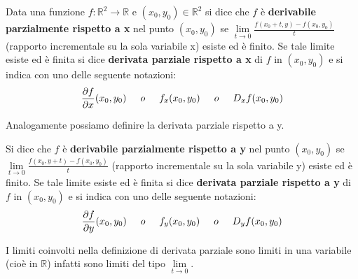 \begin{definition}
Data una funzione $f: \mathbb{R}^2 \to \mathbb{R}$ e $(x_0,y_0)\in \mathbb{R}^2$ si dice che $f$ è \textbf{derivabile parzialmente rispetto a x}  nel punto $(x_0,y_0)$ se $\lim\limits_{t\to 0}\frac{f(x_0 + t, y) - f(x_0,y_0)}{t}$ (rapporto incrementale su la sola variabile x) esiste ed è finito. Se tale limite esiste ed è finita si dice \textbf{derivata parziale rispetto a x} di $f$ in $(x_0,y_0)$ e si indica con uno delle seguente notazioni:
\vspace{-5pt}
\[\frac{\partial f}{\partial x}(x_0,y_0) \hspace{.5cm}o\hspace{.5cm} f_x(x_0,y_0) \hspace{.5cm}o\hspace{.5cm} D_x f(x_0,y_0)\]
\end{definition}
\hspace{-15pt}Analogamente possiamo definire la derivata parziale rispetto a y.
\begin{definition}
Si dice che $f$ è \textbf{derivabile parzialmente rispetto a y}  nel punto $(x_0,y_0)$ se $\lim\limits_{t\to 0}\frac{f(x_0, y+t) - f(x_0,y_0)}{t}$ (rapporto incrementale su la sola variabile y) esiste ed è finito. Se tale limite esiste ed è finita si dice \textbf{derivata parziale rispetto a y} di $f$ in $(x_0,y_0)$ e si indica con uno delle seguente notazioni:
\vspace{-5pt}
\[\frac{\partial f}{\partial y}(x_0,y_0) \hspace{.5cm}o\hspace{.5cm} f_y(x_0,y_0) \hspace{.5cm}o\hspace{.5cm} D_y f(x_0,y_0)\]
\end{definition}

\begin{observation}
I limiti coinvolti nella definizione di derivata parziale sono limiti in una variabile (cioè in $\mathbb{R}$) infatti sono limiti del tipo $\lim\limits_{t\to 0}$.
\end{observation}

